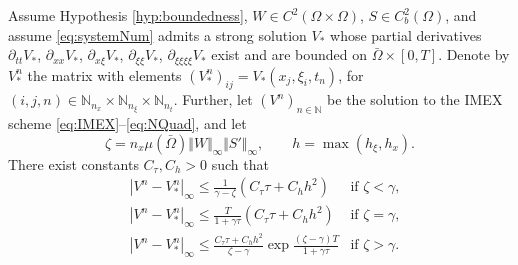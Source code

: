 \documentclass[a4paper,final]{siamart190516}
\newcommand{\Nb}{\mathbb{N}}
\begin{document}
\begin{lemma}\label{lem:IMEXconvergence}
  Assume Hypothesis \ref{hyp:boundedness}, $W \in C^2(\Omega \times \Omega)$, $S
  \in C^2_b(\Omega)$, and assume \eqref{eq:systemNum}
  admits a strong solution $V_*$ 
  whose partial derivatives $\partial_{tt}V_*$, $\partial_{xx}V_*$,
  $\partial_{x\xi}V_*$, $\partial_{\xi\xi}V_*$, $\partial_{\xi\xi\xi\xi}V_*$
  exist and are bounded on $\bar \Omega \times [0,T]$. Denote 
  by $V^n_*$ the matrix with elements $(V_*^n)_{ij} =
  V_*(x_j,\xi_i,t_n)$, for $(i,j,n) \in \Nb_{n_x} \times \Nb_{n_\xi} \times \Nb_{n_t}$. 
  Further, let $(V^n)_{n \in \Nb}$ be the solution to the IMEX scheme
  \eqref{eq:IMEX}--\eqref{eq:NQuad}, and let
  \[
    \zeta = n_x \mu(\bar\Omega) \Vert W \Vert_\infty \Vert S' \Vert_\infty, 
  \qquad
  h = \max(h_\xi, h_x).
  \]
  There exist constants $C_\tau, C_h >0$ such that
  \begin{align}
     & |V^n - V_*^n|_\infty \leq \frac{1}{\gamma -\zeta}(C_\tau \tau + C_h h^2) 
	  & \text{if $\zeta < \gamma$} \label{eq:bound1}, \\
     & |V^n - V_*^n|_\infty \leq \frac{T}{1+ \gamma \tau} (C_\tau \tau + C_h h^2)
	  & \text{if $\zeta = \gamma$} \label{eq:bound2}, \\
     & |V^n - V_*^n|_\infty \leq 
     \frac{C_\tau \tau + C_h h^2}{\zeta - \gamma} \exp 
     \frac{(\zeta - \gamma) T}{1+\gamma \tau}
          & \text{if $\zeta > \gamma$} \label{eq:bound3}.
  \end{align}
\end{lemma}
\end{document}
